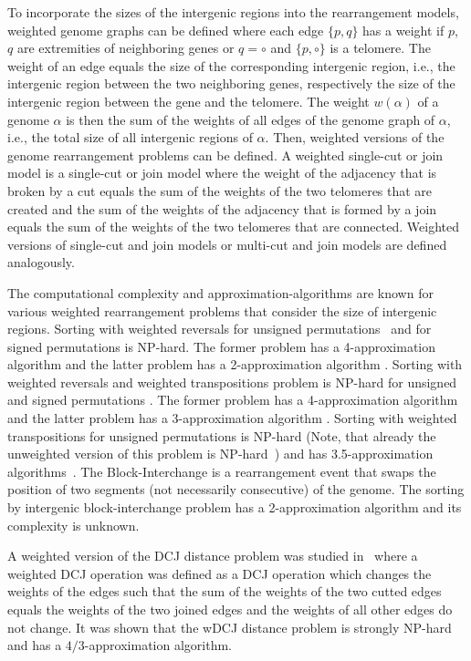 \documentclass{svmult}
\begin{document}
To incorporate the sizes of the intergenic regions into the rearrangement models,
weighted genome graphs can be defined where each edge $\{p,q\}$ has a weight if
$p$, $q$ are extremities of neighboring genes or $q=\circ$ and $\{p,\circ\}$ is a
telomere. The weight of an edge equals the size of the corresponding intergenic
region, i.e., the intergenic region between the two neighboring genes,
respectively the size of the intergenic region between the gene and the
telomere. The weight $w(\alpha)$ of a genome $\alpha$ is then the sum of the
weights of all edges of the genome graph of $\alpha$, i.e., the total size of all
intergenic regions of $\alpha$. Then, weighted versions of the genome
rearrangement problems can be defined. A weighted single-cut or join model is a
single-cut or join model where the weight of the adjacency that is broken by a
cut equals the sum of the weights of the two telomeres that are created and the
sum of the weights of the adjacency that is formed by a join equals the sum of
the weights of the two telomeres that are connected. Weighted versions of
single-cut and join models or multi-cut and join models are defined analogously.

The computational complexity and approximation-algorithms are known for various
weighted rearrangement problems that consider the size of intergenic regions.
Sorting with weighted reversals for unsigned permutations~\cite{brito2020sorting} and for signed
permutations \cite{oliveira2020sorting} is NP-hard. The former problem has a 4-approximation algorithm
\cite{brito2020sorting} and the latter problem has a 2-approximation algorithm \cite{oliveira2020sorting}. Sorting with
weighted reversals and weighted transpositions problem is NP-hard for unsigned
and signed permutations \cite{oliveira2021sorting}. The former problem has a 4-approximation algorithm
\cite{dias2019block} and the latter problem has a 3-approximation algorithm \cite{oliveira2021sorting}. Sorting with
weighted transpositions for unsigned permutations is NP-hard \cite{oliveira20203} (Note, that
already the unweighted version of this problem is NP-hard~\cite{Bulteau_2012}) and has
3.5-approximation algorithms~\cite{oliveira20203}. The Block-Interchange is a rearrangement event
that swaps the position of two segments (not necessarily consecutive) of the
genome. The sorting by intergenic block-interchange problem has a
2-approximation algorithm \cite{dias2019block} and its complexity is unknown.

A weighted version of the DCJ distance problem was studied in~\cite{fertin2017algorithms} where a
weighted DCJ operation was defined as a DCJ operation which changes the weights
of the edges such that the sum of the weights of the two cutted edges equals the
weights of the two joined edges and the weights of all other edges do not
change.  It was shown that the wDCJ distance problem is strongly NP-hard and has
a $4/3$-approximation algorithm.
\end{document}
